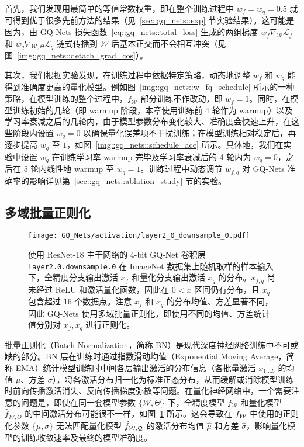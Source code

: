 首先，我们发现用最简单的等值常数权重，即在整个训练过程中 $w_f = w_q = 0.5$ 就可得到优于很多先前方法的结果（见~\ref{sec::gq_nets::exp} 节实验结果）。这可能是因为，由 GQ-Nets 损失函数~\eqref{eq::gq_nets::total_loss} 生成的两组梯度 $w_f \nabla_{\mathcal{W}}\mathcal{L}_f$ 和 $w_q \nabla_{\mathcal{W}, \Theta}\mathcal{L}_q$ 链式传播到 $\mathcal{W}$ 后基本正交而不会相互冲突（见图~\ref{img::gq_nets::detach_grad_cos}）。

其次，我们根据实验发现，在训练过程中依据特定策略，动态地调整 $w_f$ 和 $w_q$ 能得到准确度更高的量化模型。例如图~\ref{img::gq_nets::w_fq_schedule} 所示的一种策略，在模型训练的整个过程中，$f_{\mathcal{W}}$ 部分训练不作改动，即 $w_f = 1$。同时，在模型训练初始的几轮（即 warmup 阶段，本章使用训练前 $4$ 轮作为 warmup）以及学习率衰减之后的几轮内，由于模型参数分布变化较大、准确度会快速上升，在这些阶段内设置 $w_q = 0$ 以确保量化误差项不干扰训练；在模型训练相对稳定后，再逐步提高 $w_q$ 至 $1$，如图~\ref{img::gq_nets::schedule_acc} 所示。具体地，我们在实验中设置 $w_q$ 在训练学习率 warmup 完毕及学习率衰减后的 4 轮内为 $w_q = 0$，之后在 5 轮内线性地 warmup 至 $w_q = 1$。训练过程中动态调节 $w_{f, q}$ 对 GQ-Nets 准确率的影响详见第~\ref{sec::gq_nets::ablation_study} 节的实验。
\subsection{多域批量正则化}

\begin{figure}[htb]
  \centering
  \texttt{[image: GQ\_Nets/activation/layer2\_0\_downsample\_0.pdf]}
  \caption{使用 ResNet-18 主干网络的 4-bit GQ-Net 卷积层 \texttt{layer2.0.downsample.0} 在 ImageNet 数据集上随机取样的样本输入下，全精度分支输出激活 $x_f$ 和量化分支输出激活 $x_q$ 的分布。$x_{f, q}$ 尚未经过 ReLU 和激活量化函数，因此在 $0 < x$ 区间仍有分布，且 $x_q$ 包含超过 $16$ 个数据点。注意 $x_f$ 和 $x_q$ 的分布均值、方差显著不同，因此 GQ-Nets 使用多域批量正则化，即使用不同的均值、方差统计值分别对 $x_f, x_q$ 进行正则化。}
  \label{img::gq_nets::fp_q_act_dist}
\end{figure}

批量正则化（Batch Normalization，简称 BN）是现代深度神经网络训练中不可或缺的部分。BN 层在训练时通过指数滑动均值（Exponential Moving Average，简称 EMA）统计模型训练时中间各层输出激活的分布信息（各批量激活 $x_{1\ldots L}$ 的均值 $\mu$、方差 $\sigma$），将各激活分布归一化为标准正态分布，从而缓解或消除模型训练时前向传播激活消失、反向传播梯度弥散等问题。在量化神经网络中，一个需要注意的问题是，即使在同一套模型参数 $\{\mathcal{W}, \Theta\}$ 下，全精度模型 $f_{\mathcal{W}}$ 和量化模型 $\hat{f}_{\mathcal{W}, \Theta}$ 的中间激活分布可能很不一样，如图~\ref{img::gq_nets::fp_q_act_dist} 所示。这会导致在 $f_{\mathcal{W}}$ 中使用的正则化参数 $\{\mu, \sigma\}$ 无法匹配量化模型 $\hat{f}_{\mathcal{W, Q}}$ 的激活分布均值 $\hat{\mu}$ 和方差 $\hat{\sigma}$，影响量化模型的训练收敛速率及最终的模型准确度。


